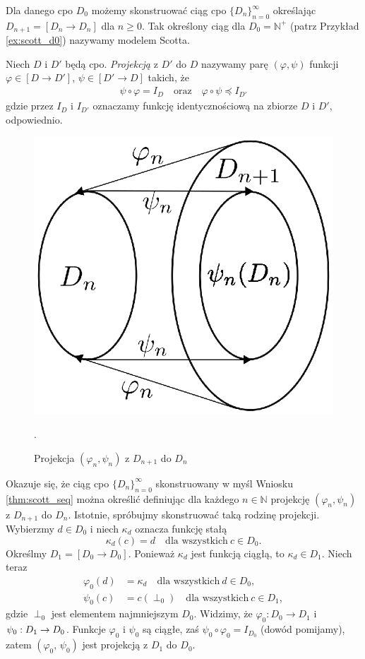   \begin{definicja}\label{thm:scott_seq}
    Dla danego cpo \(D_0\) możemy skonstruować ciąg cpo \(\{D_n\}_{n=0}^{\infty}\) określając \(D_{n+1}=[D_n\to D_n]\) dla \(n\geq 0\). Tak określony ciąg dla \(D_0=\mathbb{N}^{+}\) (patrz Przykład \ref{ex:scott_d0}) nazywamy modelem Scotta.
  \end{definicja}
\begin{definicja}[Projekcja]%
Niech \(D\) i \(D'\) będą cpo. \emph{Projekcją} z \(D'\) do \(D\) nazywamy parę \((\varphi, \psi)\) funkcji \(\varphi \in [D\to D']\), \(\psi \in [D'\to D]\) takich, że
\begin{align}
\psi\circ \varphi = I_D\quad \text{oraz}\quad \varphi\circ \psi \preceq I_{D'} %
\end{align}
gdzie przez \(I_D\) i \(I_{D'}\) oznaczamy funkcję identycznościową na zbiorze \(D\) i \(D'\), odpowiednio.
\end{definicja}

\begin{figure}[h]
  \centering
\includegraphics[width=0.32\linewidth]{../embeding_i}
  \caption{Projekcja \((\varphi_n,\psi_n)\) z \(D_{n+1}\) do \(D_n\)}.\label{fig:projection}
\end{figure}

  Okazuje się, że ciąg cpo \(\{D_n\}_{n=0}^\infty\) skonstruowany w myśl Wniosku \ref{thm:scott_seq} można określić definiując dla każdego \(n\in\mathbb{N}\) projekcję \((\varphi_n,\psi_n)\) z \(D_{n+1}\) do \(D_n\). Istotnie, spróbujmy skonstruować taką rodzinę projekcji. Wybierzmy \(d\in D_0\) i niech \(\kappa_d\) oznacza funkcję stałą 
  \[\kappa_d(c)=d\quad \text{dla wszystkich}\ c\in D_0.\]
  Określmy \(D_1=[D_0\to D_0]\). Ponieważ \(\kappa_d\) jest funkcją ciągłą, to \(\kappa_d\in D_1\). Niech teraz
  \begin{align*}
    \varphi_0 (d) &= \kappa_d  \quad \text{dla wszystkich}\ d\in D_0,\\
    \psi_0(c) &= c(\perp_0) \quad \text{dla wszystkich}\ c\in D_1,
  \end{align*}
gdzie \(\perp_0\) jest elementem najmniejszym \(D_0\). Widzimy, że \(\varphi_0: D_0 \to D_1\) i \(\psi_0:\nobreak D_1\to\nobreak D_0\). Funkcje \(\varphi_0\) i \(\psi_0\) są ciągłe, zaś \(\psi_0\circ\varphi_0 = I_{D_0}\) (dowód pomijamy), zatem \((\varphi_0,\,\psi_0)\) jest projekcją z \(D_1\) do \(D_0\).

